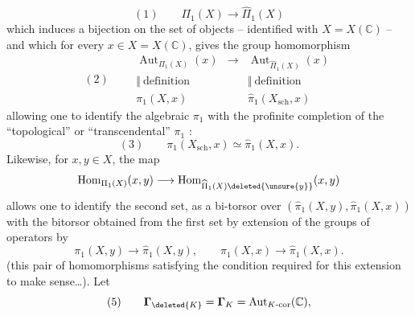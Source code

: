 \[
(1)\qquad\Pi_1(X)\longrightarrow\widehat\Pi_1(X)
\]
which induces a bijection on the set of objects  -- identified with $X=X(\mathbb C)$ -- and which  for every $x\in X=X(\mathbb C)$, gives the group homomorphism
\[
(2)\qquad
\begin{array}{ccc}
\operatorname{Aut}_{\Pi_1(X)}(x)&\longrightarrow&\operatorname{Aut}_{\widehat\Pi_1(X)}(x)\\
\Vert\ \text{definition}&&\Vert\ \text{definition}\\
\pi_1(X,x)&&\widehat\pi_1(X_{\mathrm{sch}},x)
\end{array}
\]
allowing one to identify the algebraic $\pi_1$ with the profinite completion of the ``topological'' or ``transcendental'' $\pi_1$ : 
\[
(3)\qquad\pi_1(X_{\mathrm{sch}},x)\simeq\widehat\pi_1(X,x).
\]
Likewise, for $x,y\in X$, the map
\[
\operatorname{Hom}_{\Pi_1(X)}(x,y)\longrightarrow\operatorname{Hom}_{\widehat\Pi_1(X)\deleted{\unsure{y}}}(x,y)
\]
allows one to identify the second set, as a bi-torsor over $(\widehat\pi_1(X,y),\widehat\pi_1(X,x))$ with the bitorsor obtained  from the first set by extension of the groups of operators by
\[
\pi_1(X,y)\longrightarrow\widehat\pi_1(X,y),\qquad\pi_1(X,x)\longrightarrow\widehat\pi_1(X,x).
\]
(this pair of homomorphisms satisfying  the condition required for this extension to make sense\ldots).
Let
\[
(5)\qquad\mathbf{\Gamma}_{\deleted{K}}=\mathbf{\Gamma}_K=\operatorname{Aut}_{K\text{-cor}}(\mathbb C),
\]
